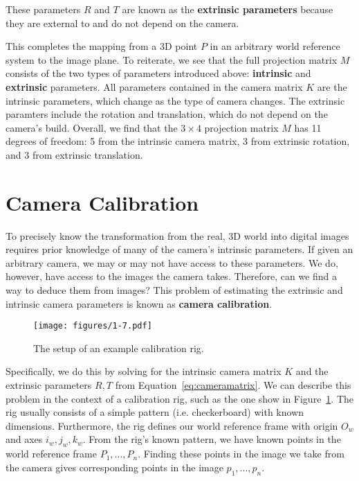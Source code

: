 \documentclass[a4paper, 12pt]{article}
\renewcommand\emph{\textbf}
\begin{document}
These parameters $R$ and $T$ are known as the \emph{extrinsic parameters} because they are external to and do not depend on the camera.

\vspace{12pt}

This completes the mapping from a 3D point $P$ in an arbitrary world reference system to the image plane. To reiterate, we see that the full projection matrix $M$ consists of the two types of parameters introduced above: \emph{intrinsic} and \emph{extrinsic} parameters. All parameters contained in the camera matrix $K$ are the intrinsic parameters, which change as the type of camera changes. The extrinsic paramters include the rotation and translation, which do not depend on the camera's build. Overall, we find that the $3\times4$ projection matrix $M$ has 11 degrees of freedom: 5 from the intrinsic camera matrix, 3 from extrinsic rotation, and 3 from extrinsic translation.

\section{Camera Calibration}
To precisely know the transformation from the real, 3D world into digital images requires prior knowledge of many of the camera's intrinsic parameters. If given an arbitrary camera, we may or may not have access to these parameters. We do, however, have access to the images the camera takes. Therefore, can we find a way to deduce them from images? This problem of estimating the extrinsic and intrinsic camera parameters is known as \emph{camera calibration}.

\begin{figure}[h!]
\centering
\texttt{[image: figures/1-7.pdf]}
\caption{The setup of an example calibration rig.}
\label{fig:calibration}
\end{figure}

Specifically, we do this by solving for the intrinsic camera matrix $K$ and the extrinsic parameters $R,T$ from Equation~\ref{eq:cameramatrix}. We can describe this problem in the context of a calibration rig, such as the one show in Figure~\ref{fig:calibration}. The rig usually consists of a simple pattern (i.e. checkerboard) with known dimensions. Furthermore, the rig defines our world reference frame with origin $O_w$ and axes $i_w, j_w, k_w$. From the rig's known pattern, we have known points in the world reference frame $P_1,...,P_n$. Finding these points in the image we take from the camera gives corresponding points in the image $p_1,...,p_n$. 
\end{document}
